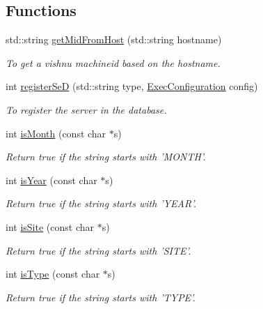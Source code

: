 \subsection*{Functions}
\begin{DoxyCompactItemize}
\item 
std::string \hyperlink{namespacevishnu_af78f0170fec9be36ee34f702cbd7ab28}{getMidFromHost} (std::string hostname)
\begin{DoxyCompactList}\small\item\em To get a vishnu machineid based on the hostname. \item\end{DoxyCompactList}\item 
int \hyperlink{namespacevishnu_acc83b00c8c11d7ae44a4dee1b8bf66f3}{registerSeD} (std::string type, \hyperlink{classExecConfiguration}{ExecConfiguration} config)
\begin{DoxyCompactList}\small\item\em To register the server in the database. \item\end{DoxyCompactList}\item 
int \hyperlink{namespacevishnu_ae3f61f1465ef34d3cf2f20c67a019b43}{isMonth} (const char $\ast$s)
\begin{DoxyCompactList}\small\item\em Return true if the string starts with 'MONTH'. \item\end{DoxyCompactList}\item 
int \hyperlink{namespacevishnu_a646794297931366c08502e5079154ccd}{isYear} (const char $\ast$s)
\begin{DoxyCompactList}\small\item\em Return true if the string starts with 'YEAR'. \item\end{DoxyCompactList}\item 
int \hyperlink{namespacevishnu_a36b8edc2218c332a4a59f2e39109d627}{isSite} (const char $\ast$s)
\begin{DoxyCompactList}\small\item\em Return true if the string starts with 'SITE'. \item\end{DoxyCompactList}\item 
int \hyperlink{namespacevishnu_abaf2c02608b3d96f1f883d65966595a5}{isType} (const char $\ast$s)
\begin{DoxyCompactList}\small\item\em Return true if the string starts with 'TYPE'. \item\end{DoxyCompactList}\item 

\end{DoxyCompactItemize}
